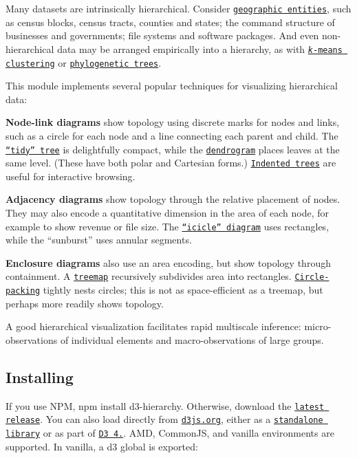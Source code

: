 Many datasets are intrinsically hierarchical. Consider \href{https://www.census.gov/geo/reference/hierarchy.html}{\tt geographic entities}, such as census blocks, census tracts, counties and states; the command structure of businesses and governments; file systems and software packages. And even non-\/hierarchical data may be arranged empirically into a hierarchy, as with \href{https://en.wikipedia.org/wiki/K-means_clustering}{\tt {\itshape k}-\/means clustering} or \href{https://bl.ocks.org/mbostock/c034d66572fd6bd6815a}{\tt phylogenetic trees}.

This module implements several popular techniques for visualizing hierarchical data\+:

{\bfseries Node-\/link diagrams} show topology using discrete marks for nodes and links, such as a circle for each node and a line connecting each parent and child. The \href{#tree}{\tt “tidy” tree} is delightfully compact, while the \href{#cluster}{\tt dendrogram} places leaves at the same level. (These have both polar and Cartesian forms.) \href{https://bl.ocks.org/mbostock/1093025}{\tt Indented trees} are useful for interactive browsing.

{\bfseries Adjacency diagrams} show topology through the relative placement of nodes. They may also encode a quantitative dimension in the area of each node, for example to show revenue or file size. The \href{#partition}{\tt “icicle” diagram} uses rectangles, while the “sunburst” uses annular segments.

{\bfseries Enclosure diagrams} also use an area encoding, but show topology through containment. A \href{#treemap}{\tt treemap} recursively subdivides area into rectangles. \href{#pack}{\tt Circle-\/packing} tightly nests circles; this is not as space-\/efficient as a treemap, but perhaps more readily shows topology.

A good hierarchical visualization facilitates rapid multiscale inference\+: micro-\/observations of individual elements and macro-\/observations of large groups.

\subsection*{Installing}

If you use N\+PM, {\ttfamily npm install d3-\/hierarchy}. Otherwise, download the \href{https://github.com/d3/d3-hierarchy/releases/latest}{\tt latest release}. You can also load directly from \href{https://d3js.org}{\tt d3js.\+org}, either as a \href{https://d3js.org/d3-hierarchy.v1.min.js}{\tt standalone library} or as part of \href{https://github.com/d3/d3}{\tt D3 4.}. A\+MD, Common\+JS, and vanilla environments are supported. In vanilla, a {\ttfamily d3} global is exported\+:


